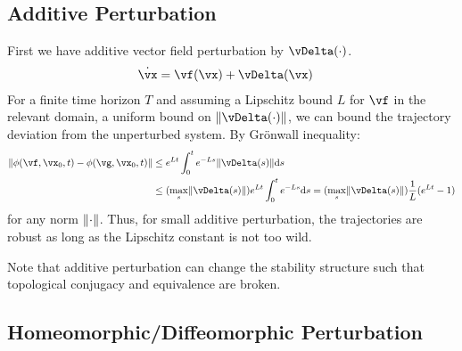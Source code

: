\documentclass[a4paper,twoside]{article}
\newcounter{ct}
\DeclarePairedDelimiter{\norm}{\lVert}{\rVert}
\begin{document}
\subsection{Additive Perturbation}
First we have additive vector field perturbation by $\vDelta(\cdot)$.
\begin{align}
    \dot{\vx} &= \vf(\vx) + \vDelta(\vx)
\end{align}
For a finite time horizon $T$ and assuming a Lipschitz bound $L$ for $\vf$ in the relevant domain, a uniform bound on $\norm{\vDelta(\cdot)}$, we can bound the trajectory deviation from the unperturbed system.
By Gr\"onwall inequality\cite{Howard2025}:
\begin{align}
    \norm{
	\phi(\vf, \vx_0, t)
	-
	\phi(\vg, \vx_0, t)
    }
    &\leq
	e^{Lt} \int_0^t e^{-Ls} \norm{\vDelta(s)} \mathrm{d}s
\\
    &\leq
	(\max_s \norm{\vDelta(s)}) e^{Lt} \int_0^t e^{-Ls} \mathrm{d}s
    =
	(\max_s \norm{\vDelta(s)}) \frac{1}{L} (e^{Lt} - 1)
\end{align}
for any norm $\norm{\cdot}$.
Thus, for small additive perturbation, the trajectories are robust as long as the Lipschitz constant is not too wild.

Note that additive perturbation can change the stability structure such that topological conjugacy and equivalence are broken.

\subsection{Homeomorphic/Diffeomorphic Perturbation}



\end{document}
